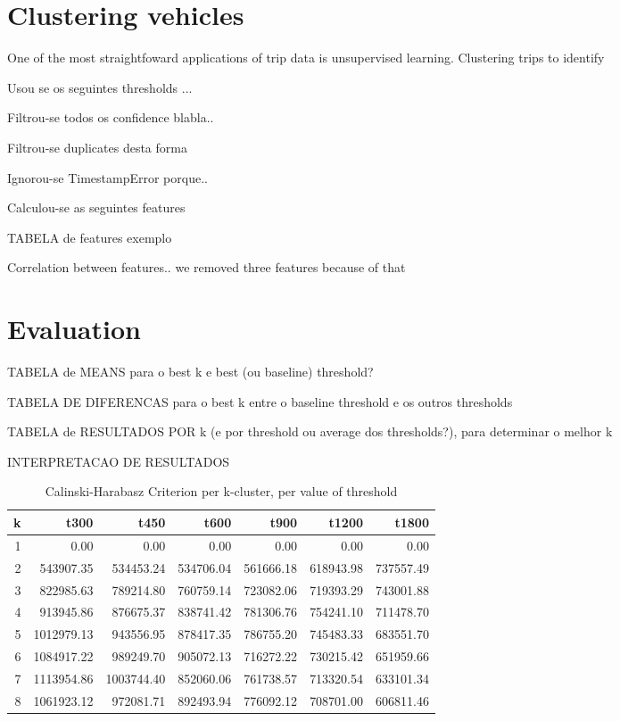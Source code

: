 \section{Clustering vehicles}\label{s.classification}

One of the most straightfoward applications of trip data is unsupervised learning. Clustering trips to identify

Usou se os seguintes thresholds ...

Filtrou-se todos os confidence blabla..

Filtrou-se duplicates desta forma

Ignorou-se TimestampError porque..

Calculou-se as seguintes features

TABELA de features exemplo

Correlation between features.. we removed three features because of that

\section{Evaluation}\label{s.results}

TABELA de MEANS para o best k e best (ou baseline) threshold?

TABELA DE DIFERENCAS para o best k entre o baseline threshold e os outros thresholds

TABELA de RESULTADOS POR k (e por threshold ou average dos thresholds?), para determinar o melhor k

INTERPRETACAO DE RESULTADOS

\clearpage

\begin{table*}[t]
\centering
\begin{tabular}{rrrrrrr}
  \hline
 k & t300 & t450 & t600 & t900 & t1200 & t1800 \\
  \hline
1 & 0.00 & 0.00 & 0.00 & 0.00 & 0.00 & 0.00 \\
  2 & 543907.35 & 534453.24 & 534706.04 & 561666.18 & 618943.98 & 737557.49 \\
  3 & 822985.63 & 789214.80 & 760759.14 & 723082.06 & 719393.29 & 743001.88 \\
  4 & 913945.86 & 876675.37 & 838741.42 & 781306.76 & 754241.10 & 711478.70 \\
  5 & 1012979.13 & 943556.95 & 878417.35 & 786755.20 & 745483.33 & 683551.70 \\
  6 & 1084917.22 & 989249.70 & 905072.13 & 716272.22 & 730215.42 & 651959.66 \\
  7 & 1113954.86 & 1003744.40 & 852060.06 & 761738.57 & 713320.54 & 633101.34 \\
  8 & 1061923.12 & 972081.71 & 892493.94 & 776092.12 & 708701.00 & 606811.46 \\
   \hline
\end{tabular}
\caption{Calinski-Harabasz Criterion per k-cluster, per value of threshold}
\end{table*}

